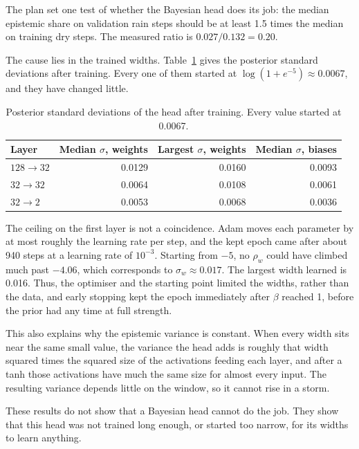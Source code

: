 \documentclass{article}
\begin{document}
The plan set one test of whether the Bayesian head does its job: the median
epistemic share on validation rain steps should be at least 1.5 times the
median on training dry steps. The measured ratio is $0.027 / 0.132 = 0.20$.

The cause lies in the trained widths. Table~\ref{tab:sigma} gives the
posterior standard deviations after training. Every one of them started at
$\log(1 + e^{-5}) \approx 0.0067$, and they have changed little.

\begin{table}[t]
  \centering
  \caption{Posterior standard deviations of the head after training. Every value
    started at 0.0067.}
  \label{tab:sigma}
  \begin{tabular}{lrrr}
    \toprule
    Layer & Median $\sigma$, weights & Largest $\sigma$, weights & Median $\sigma$, biases \\
    \midrule
    $128 \to 32$ & 0.0129 & 0.0160 & 0.0093 \\
    $32 \to 32$  & 0.0064 & 0.0108 & 0.0061 \\
    $32 \to 2$   & 0.0053 & 0.0068 & 0.0036 \\
    \bottomrule
  \end{tabular}
\end{table}

The ceiling on the first layer is not a coincidence. Adam moves each parameter
by at most roughly the learning rate per step, and the kept epoch came after
about 940 steps at a learning rate of $10^{-3}$. Starting from $-5$, no
$\rho_{w}$ could have climbed much past $-4.06$, which corresponds to
$\sigma_{w} \approx 0.017$. The largest width learned is 0.016. Thus, the
optimiser and the starting point limited the widths, rather than the data, and
early stopping kept the epoch immediately after $\beta$ reached 1, before the
prior had any time at full strength.

This also explains why the epistemic variance is constant. When every width
sits near the same small value, the variance the head adds is roughly that
width squared times the squared size of the activations feeding each layer, and
after a tanh those activations have much the same size for almost every input.
The resulting variance depends little on the window, so it cannot rise in a
storm.

These results do not show that a Bayesian head cannot do the job. They show
that this head was not trained long enough, or started too narrow, for its
widths to learn anything.
\end{document}
